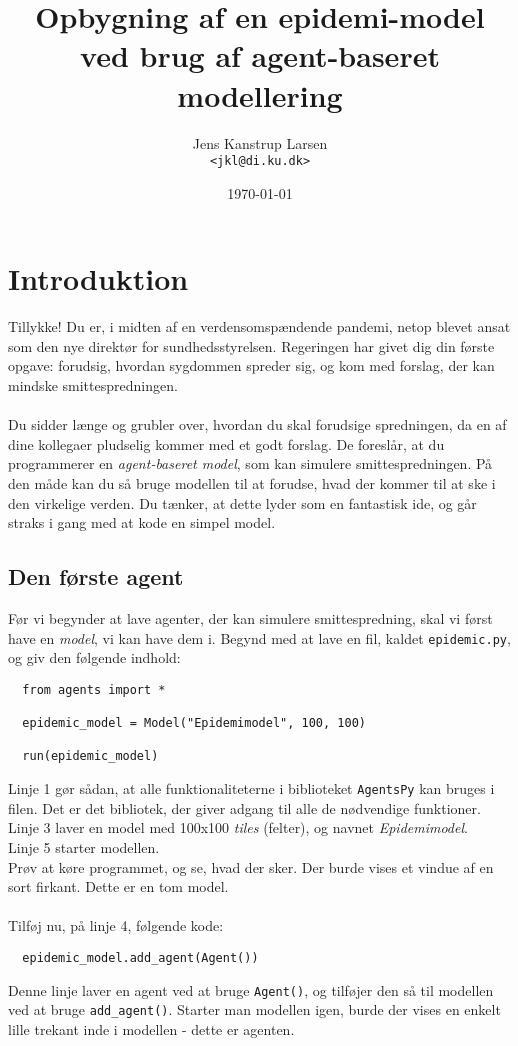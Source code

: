 \documentclass{article}
\title{Opbygning af en epidemi-model\\
\large ved brug af agent-baseret modellering}
\author{Jens Kanstrup Larsen\\ \texttt{<jkl@di.ku.dk>}}
\date{\today}
\begin{document}
\maketitle

\section{Introduktion}
Tillykke! Du er, i midten af en verdensomspændende pandemi, netop blevet ansat som den nye direktør for sundhedsstyrelsen. Regeringen har givet dig din første opgave: forudsig, hvordan sygdommen spreder sig, og kom med forslag, der kan mindske smittespredningen.\\\\
Du sidder længe og grubler over, hvordan du skal forudsige spredningen, da en af dine kollegaer pludselig kommer med et godt forslag. De foreslår, at du programmerer en \textit{agent-baseret model}, som kan simulere smittespredningen. På den måde kan du så bruge modellen til at forudse, hvad der kommer til at ske i den virkelige verden. Du tænker, at dette lyder som en fantastisk ide, og går straks i gang med at kode en simpel model.

\subsection{Den første agent}
Før vi begynder at lave agenter, der kan simulere smittespredning, skal vi først have en \textit{model}, vi kan have dem i. Begynd med at lave en fil, kaldet \texttt{epidemic.py}, og giv den følgende indhold:
\begin{lstlisting}
  from agents import *

  epidemic_model = Model("Epidemimodel", 100, 100)

  run(epidemic_model)
\end{lstlisting}
Linje 1 gør sådan, at alle funktionaliteterne i biblioteket \texttt{AgentsPy} kan bruges i filen. Det er det bibliotek, der giver adgang til alle de nødvendige funktioner.\\
Linje 3 laver en model med 100x100 \textit{tiles} (felter), og navnet \textit{Epidemimodel}.\\
Linje 5 starter modellen.\\
Prøv at køre programmet, og se, hvad der sker. Der burde vises et vindue af en sort firkant. Dette er en tom model.\\\\
Tilføj nu, på linje 4, følgende kode:
\begin{lstlisting}
  epidemic_model.add_agent(Agent())
\end{lstlisting}
Denne linje laver en agent ved at bruge \texttt{Agent()}, og tilføjer den så til modellen ved at bruge \texttt{add\_agent()}. Starter man modellen igen, burde der vises en enkelt lille trekant inde i modellen - dette er agenten.
\end{document}
